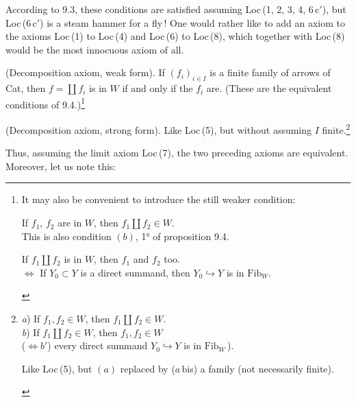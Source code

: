\documentclass[11pt]{article}
\newcommand{\msp}[1]{\marginpar{\footnotesize [#1]}}
\newcommand{\Fib}{\mathrm{Fib}}
\begin{document}
\msp{page 124}

According to 9.3, these conditions are satisfied assuming Loc\,(1, 2, 3, 4, 6\,c$'$), but Loc\,(6\,c$'$) is a steam hammer for a fly\,! One would rather like to add an axiom to the axioms Loc\,(1) to Loc\,(4) and Loc\,(6) to Loc\,(8), which together with Loc\,(8) would be the most innocuous axiom of all.

\begin{description}[labelwidth=5.5em,leftmargin=6.5em,style=sameline]
\item[Loc\,(5)] (Decomposition axiom, weak form). If $(f_i)_{i\in I}$ is a finite family of arrows of Cat, then $f=\coprod f_i$ is in $W$ if and only if the $f_i$ are. (These are the equivalent conditions of 9.4.)\footnote[48]{It may also be convenient to introduce the still weaker condition:
\begin{description}[nosep,labelwidth=4.5em,leftmargin=5em,style=sameline]
\item[Loc\,(5\,a)] If $f_1$, $f_2$ are in $W$, then $f_1\amalg f_2\in W$.\\
This is also condition $(b)$, 1° of proposition 9.4.
\item[Loc\,(5\,b)] If $f_1\amalg f_2$ is in $W$, then $f_1$ and $f_2$ too.\\
$\iff$ If $Y_0\subset Y$ is a direct summand, then $Y_0\hookrightarrow Y$ is in $\Fib_W$.
\end{description}}

\item[Loc\,(5\,bis)] (Decomposition axiom, strong form). Like Loc\,(5), but without assuming $I$ finite.\footnote[49]{
\begin{description}[nosep,labelwidth=4.5em,leftmargin=5em,style=sameline]
\item[Loc\,(5)] \textit{a}) If $f_1,f_2\in W$, then $f_1\amalg f_2\in W$.\\
\textit{b}) If $f_1\amalg f_2\in W$, then $f_1,f_2\in W$\\
($\iff b'$) every direct summand $Y_0\hookrightarrow Y$ is in $\Fib_W$\,).
\item[Loc\,(5\,bis)] Like Loc\,(5), but $(a)$ replaced by ($a$\,bis) a family (not necessarily finite).
\end{description}}
\end{description}

Thus, assuming the limit axiom Loc\,(7), the two preceding axioms are equivalent. Moreover, let us note this:
\end{document}
